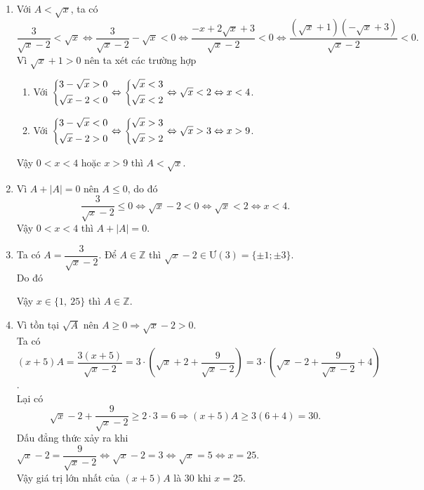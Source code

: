 \begin{bt}
{\begin{enumerate}
\begin{enumerate}
				\item[] Với $ \heva{&5-\sqrt{x}<0\\ &\sqrt{x}-2<0}\Leftrightarrow\heva{&\sqrt{x}>5\\ &\sqrt{x}<2} $ (vô lí).
			\end{enumerate}
			Vậy $ 4<x<25,\ x\neq 9 $ thì $ A>1 $.
			\item Với $ A<\sqrt{x} $, ta có
			\[ 
			\dfrac{3}{\sqrt{x}-2}<\sqrt{x}\Leftrightarrow \dfrac{3}{\sqrt{x}-2}-\sqrt{x}<0\Leftrightarrow \dfrac{-x+2\sqrt{x}+3}{\sqrt{x}-2}<0\Leftrightarrow \dfrac{(\sqrt{x}+1)(-\sqrt{x}+3)}{\sqrt{x}-2}<0.
			\]
			Vì $ \sqrt{x}+1>0 $ nên ta xét các trường hợp
			\begin{enumerate}
				\item[] Với $ \left\{\begin{aligned}&3-\sqrt{x}>0\\ &\sqrt{x}-2<0\end{aligned}\right.\Leftrightarrow\left\{\begin{aligned}&\sqrt{x}<3\\ &\sqrt{x}<2\end{aligned}\right.\Leftrightarrow \sqrt{x}<2\Leftrightarrow x<4 $.
				\item[] Với $ \left\{\begin{aligned}&3-\sqrt{x}<0\\ &\sqrt{x}-2>0\end{aligned}\right.\Leftrightarrow\left\{\begin{aligned}&\sqrt{x}>3\\ &\sqrt{x}>2\end{aligned}\right.\Leftrightarrow \sqrt{x}>3\Leftrightarrow x>9 $.
			\end{enumerate}
			Vậy $ 0<x<4 $ hoặc $ x>9 $ thì $ A<\sqrt{x} $.
			\item Vì $ A+|A|=0 $ nên $ A\leq 0 $, do đó
			\[
			\dfrac{3}{\sqrt{x}-2}\leq 0\Leftrightarrow \sqrt{x}-2<0\Leftrightarrow \sqrt{x}<2\Leftrightarrow x<4.
			\]
			Vậy $ 0< x<4 $ thì $ A+|A|=0 $.
			\item Ta có $ A=\dfrac{3}{\sqrt{x}-2} $. Để $ A\in \mathbb{Z} $ thì $ \sqrt{x}-2\in\text{Ư}(3)=\{\pm 1;\pm 3\} $.\\
			Do đó
			\begin{center}
			\end{center}
			Vậy $ x\in\{1,\ 25\} $ thì $ A\in\mathbb{Z} $.
			\item Vì tồn tại $ \sqrt{A} $ nên $ A\geq 0\Rightarrow \sqrt{x}-2>0 $.\\
			Ta có $ (x+5)A=\dfrac{3(x+5)}{\sqrt{x}-2}=3\cdot\left(\sqrt{x}+2+\dfrac{9}{\sqrt{x}-2} \right)=3\cdot\left(\sqrt{x}-2+\dfrac{9}{\sqrt{x}-2}+4 \right) $.\\
			Lại có
			\[ 
			\sqrt{x}-2+\dfrac{9}{\sqrt{x}-2}\geq 2\cdot 3=6\Rightarrow (x+5)A\geq 3(6+4)=30.
			\]
			Dấu đẳng thức xảy ra khi $ \sqrt{x}-2=\dfrac{9}{\sqrt{x}-2}\Leftrightarrow \sqrt{x}-2=3\Leftrightarrow \sqrt{x}=5\Leftrightarrow x=25 $.\\
			Vậy giá trị lớn nhất của $ (x+5)A $ là $ 30 $ khi $ x=25 $.
		\end{enumerate}
	}
\end{bt}
